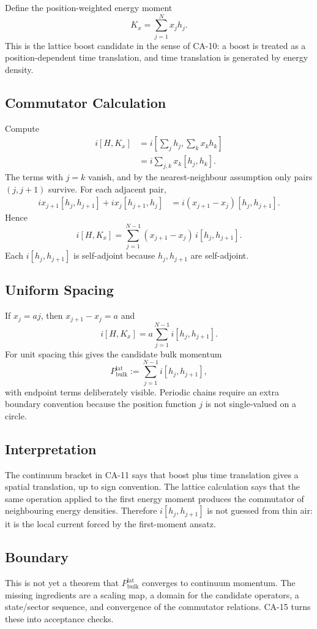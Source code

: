 Define the position-weighted energy moment
\[
  K_x=\sum_{j=1}^N x_j h_j.
\]
This is the lattice boost candidate in the sense of CA-10: a boost is treated as
a position-dependent time translation, and time translation is generated by
energy density.

\subsection{Commutator Calculation}

Compute
\[
\begin{aligned}
  i[H,K_x]
  &= i\left[\sum_j h_j,\sum_k x_k h_k\right]\\
  &= i\sum_{j,k}x_k[h_j,h_k].
\end{aligned}
\]
The terms with \(j=k\) vanish, and by the nearest-neighbour assumption only
pairs \((j,j+1)\) survive.  For each adjacent pair,
\[
\begin{aligned}
  i x_{j+1}[h_j,h_{j+1}]
  + i x_j[h_{j+1},h_j]
  &= i(x_{j+1}-x_j)[h_j,h_{j+1}].
\end{aligned}
\]
Hence
\[
  i[H,K_x]
  =
  \sum_{j=1}^{N-1}(x_{j+1}-x_j)\,i[h_j,h_{j+1}].
\]
Each \(i[h_j,h_{j+1}]\) is self-adjoint because \(h_j,h_{j+1}\) are
self-adjoint.

\subsection{Uniform Spacing}

If \(x_j=aj\), then \(x_{j+1}-x_j=a\) and
\[
  i[H,K_x]=a\sum_{j=1}^{N-1}i[h_j,h_{j+1}].
\]
For unit spacing this gives the candidate bulk momentum
\[
  P_{\mathrm{bulk}}^{\mathrm{lat}}
  :=
  \sum_{j=1}^{N-1}i[h_j,h_{j+1}],
\]
with endpoint terms deliberately visible.  Periodic chains require an extra
boundary convention because the position function \(j\) is not single-valued on
a circle.

\subsection{Interpretation}

The continuum bracket in CA-11 says that boost plus time translation gives a
spatial translation, up to sign convention.  The lattice calculation says that
the same operation applied to the first energy moment produces the commutator of
neighbouring energy densities.  Therefore \(i[h_j,h_{j+1}]\) is not guessed from
thin air: it is the local current forced by the first-moment ansatz.

\subsection{Boundary}

This is not yet a theorem that \(P_{\mathrm{bulk}}^{\mathrm{lat}}\) converges to
continuum momentum.  The missing ingredients are a scaling map, a domain for the
candidate operators, a state/sector sequence, and convergence of the commutator
relations.  CA-15 turns these into acceptance checks.
